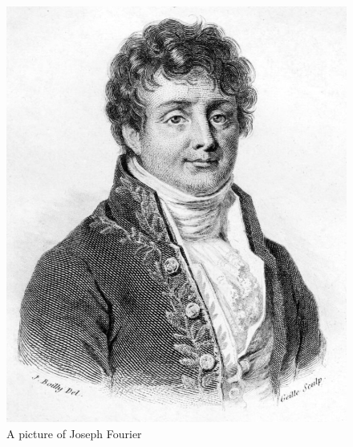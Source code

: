 \documentclass[11pt]{article}
\begin{document}
\begin{figure}[htp]

\centering
\includegraphics[width=\textwidth]{img/Fourier.jpg}
\caption{A picture of Joseph Fourier}
\label{fig:1}
\end{figure}


	
\end{document}

